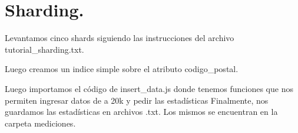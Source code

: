 \section{Sharding.}
Levantamos cinco shards siguiendo las instrucciones del archivo tutorial\_sharding.txt.

Luego creamos un indice simple sobre el atributo codigo\_postal.

Luego importamos el código de insert\_data.js donde tenemos
funciones que nos permiten ingresar datos de a 20k y pedir las estadísticas
Finalmente, nos guardamos las estadísticas en archivos .txt. Los mismos se encuentran en
la carpeta mediciones.